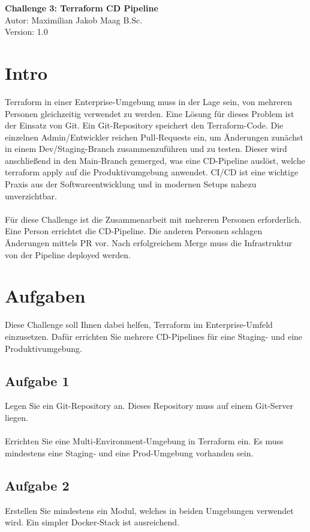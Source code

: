 \documentclass{article}
\begin{document}
    \begin{center}
        \Large \textbf{Challenge 3: Terraform CD Pipeline} \\ [6pt]
        \normalsize
        Autor: Maximilian Jakob Maag B.Sc. \\
        Version: 1.0
    \end{center}
    \section{Intro}
    Terraform in einer Enterprise-Umgebung muss in der Lage sein, von mehreren Personen gleichzeitig verwendet zu werden.
    Eine Lösung für dieses Problem ist der Einsatz von Git. Ein Git-Repository speichert den Terraform-Code. Die einzelnen Admin/Entwickler reichen Pull‑Requests ein, um Änderungen zunächst in
    einem Dev/Staging-Branch zusammenzuführen und zu testen. Dieser wird anschließend in den Main-Branch gemerged, was eine CD-Pipeline auslöst, welche terraform apply auf die Produktivumgebung anwendet.
    CI/CD ist eine wichtige Praxis aus der Softwareentwicklung und in modernen Setups nahezu unverzichtbar.
    \\ \\
    Für diese Challenge ist die Zusammenarbeit mit mehreren Personen erforderlich. Eine Person errichtet die CD‑Pipeline.
    Die anderen Personen schlagen Änderungen mittels PR vor. Nach erfolgreichem Merge muss die Infrastruktur von der Pipeline deployed werden.
    \section{Aufgaben}
    Diese Challenge soll Ihnen dabei helfen, Terraform im Enterprise-Umfeld einzusetzen.
    Dafür errichten Sie mehrere CD-Pipelines für eine Staging- und eine Produktivumgebung.

    \subsection{Aufgabe 1}
    Legen Sie ein Git-Repository an. Dieses Repository muss auf einem Git-Server liegen.  \\ \\
    Errichten Sie eine Multi‑Environment‑Umgebung in Terraform ein. Es muss mindestens eine Staging‑ und eine Prod-Umgebung vorhanden sein.

    \subsection{Aufgabe 2}
    Erstellen Sie mindestens ein Modul, welches in beiden Umgebungen verwendet wird. Ein simpler Docker-Stack ist ausreichend.
\end{document}
